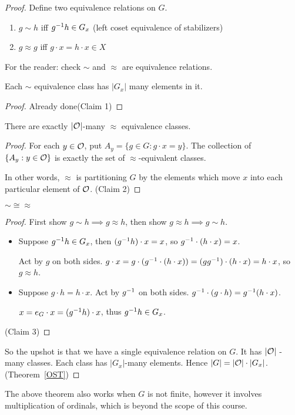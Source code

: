 \documentclass[notes.tex]{subfiles}
\begin{document}
\begin{proof}
	Define two equivalence relations on $G$.
	\begin{enumerate}
		\item $g\sim h$ iff ${g}^{-1}h \in G_x$ (left coset equivalence of stabilizers)
		\item $g\approx g$ iff $g\cdot x = h\cdot x\in X$
	\end{enumerate}
	For the reader: check $\sim$ and $\approx$ are equivalence relations.

	\begin{claim}[1]
		Each $\sim$ equivalence class has $|G_x|$ many elements in it.
	\end{claim}
	\begin{proof}
		Already done\qedhere(Claim 1)
	\end{proof}
	\begin{claim}[2]
		There are exactly $|\mathcal{O}|$-many $\approx$ equivalence classes.
	\end{claim}
	\begin{proof}
		For each $y\in \mathcal{O}$, put $A_y = \{g\in G: g\cdot x = y\}$.
		The collection of $\{A_y : y\in\mathcal{O}\}$ is exactly  the set of $\approx$-equivalent classes.

		In other words, $\approx$ is partitioning $G$ by the elements which move $x$ into each particular element of $\mathcal{O}$.
		\qedhere(Claim 2)
	\end{proof}
	\begin{claim}[3]
		$\sim \cong \approx$
	\end{claim}
	\begin{proof}
		First show $g\sim h \implies g\approx h$, then show $g\approx h \implies g\sim h$.
		\begin{itemize}
			\item Suppose ${g}^{-1}h\in G_x$, then
				$({g}^{-1}h)\cdot x = x$, so
				${g}^{-1} \cdot (h \cdot x) = x$.

				Act by $g$ on both sides. 
					$g\cdot x = g\cdot ({g}^{-1} \cdot (h \cdot x)) = (g{g}^{-1})\cdot (h\cdot x) = h\cdot x$, so $g\approx h$.
			\item 
			Suppose $g\cdot h = h \cdot x$. Act by ${g}^{-1}$ on both sides. ${g}^{-1} \cdot (g\cdot h) = {g}^{-1} (h\cdot x)$.

			$x = e_G\cdot x = ({g}^{-1}h)\cdot x$, thus ${g}^{-1}h \in G_x$.
		\end{itemize}
		\qedhere(Claim 3)
	\end{proof}
	So the upshot is that we have a single equivalence relation on $G$. It has $|\mathcal{O}|$ -many classes. Each class has $|G_x|$-many elements. Hence $|G| = |\mathcal{O}|\cdot|G_x|$.\qedhere(Theorem~\ref{OST})
\end{proof}

\begin{remark}
	The above theorem also works when $G$ is not finite, however it involves multiplication of ordinals, which is beyond the scope of this course.
\end{remark}
\end{document}
